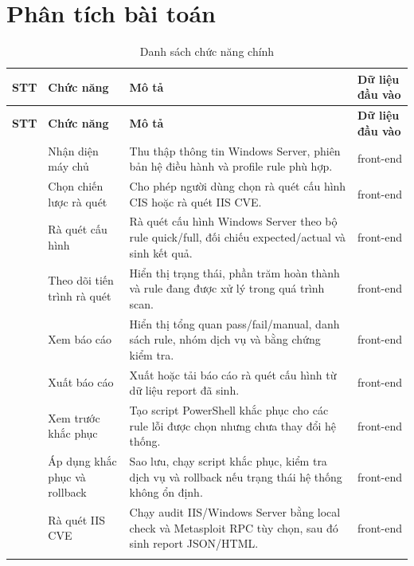 \documentclass[12pt,a4paper]{report}
\begin{document}
\chapter{Phân tích bài toán}

\begin{longtable}{|>{\centering\arraybackslash}p{}|p{}|p{}|p{}|}
\hline
\textbf{STT} & \textbf{Chức năng} & \textbf{Mô tả} & \textbf{Dữ liệu đầu vào} \\ \hline
\endfirsthead
\hline
\textbf{STT} & \textbf{Chức năng} & \textbf{Mô tả} & \textbf{Dữ liệu đầu vào} \\ \hline
\endhead
1 & Nhận diện máy chủ & Thu thập thông tin Windows Server, phiên bản hệ điều hành và profile rule phù hợp. & front-end \\ \hline
2 & Chọn chiến lược rà quét & Cho phép người dùng chọn rà quét cấu hình CIS hoặc rà quét IIS CVE. & front-end \\ \hline
3 & Rà quét cấu hình & Rà quét cấu hình Windows Server theo bộ rule quick/full, đối chiếu expected/actual và sinh kết quả. & front-end \\ \hline
4 & Theo dõi tiến trình rà quét & Hiển thị trạng thái, phần trăm hoàn thành và rule đang được xử lý trong quá trình scan. & front-end \\ \hline
5 & Xem báo cáo & Hiển thị tổng quan pass/fail/manual, danh sách rule, nhóm dịch vụ và bằng chứng kiểm tra. & front-end \\ \hline
6 & Xuất báo cáo & Xuất hoặc tải báo cáo rà quét cấu hình từ dữ liệu report đã sinh. & front-end \\ \hline
7 & Xem trước khắc phục & Tạo script PowerShell khắc phục cho các rule lỗi được chọn nhưng chưa thay đổi hệ thống. & front-end \\ \hline
8 & Áp dụng khắc phục và rollback & Sao lưu, chạy script khắc phục, kiểm tra dịch vụ và rollback nếu trạng thái hệ thống không ổn định. & front-end \\ \hline
9 & Rà quét IIS CVE & Chạy audit IIS/Windows Server bằng local check và Metasploit RPC tùy chọn, sau đó sinh report JSON/HTML. & front-end \\ \hline
\caption{Danh sách chức năng chính}
\end{longtable}
\end{document}

